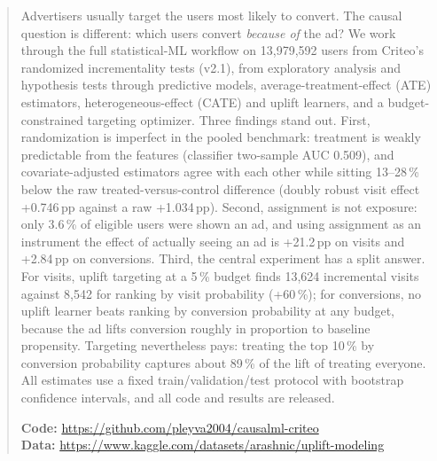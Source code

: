 \begin{abstract}
Advertisers usually target the users most likely to convert. The causal
question is different: which users convert \emph{because of} the ad? We work
through the full statistical-ML workflow on 13,979,592 users from Criteo's
randomized incrementality tests (v2.1), from exploratory analysis and
hypothesis tests through predictive models, average-treatment-effect (ATE)
estimators, heterogeneous-effect (CATE) and uplift learners, and a
budget-constrained targeting optimizer. Three findings stand out. First,
randomization is imperfect in the pooled benchmark: treatment is weakly
predictable from the features (classifier two-sample AUC 0.509), and
covariate-adjusted estimators agree with each other while sitting 13--28\,\%
below the raw treated-versus-control difference (doubly robust visit effect
+0.746\,pp against a raw +1.034\,pp). Second, assignment is not exposure: only
3.6\,\% of eligible users were shown an ad, and using assignment as an
instrument the effect of actually seeing an ad is +21.2\,pp on visits and
+2.84\,pp on conversions. Third, the central experiment has a split answer.
For visits, uplift targeting at a 5\,\% budget finds 13,624 incremental
visits against 8,542 for ranking by visit probability (+60\,\%); for
conversions, no uplift learner beats ranking by conversion probability at any
budget, because the ad lifts conversion roughly in proportion to baseline
propensity. Targeting nevertheless pays: treating the top 10\,\% by
conversion probability captures about 89\,\% of the lift of treating
everyone. All estimates use a fixed train/validation/test protocol with
bootstrap confidence intervals, and all code and results are released.

\medskip\noindent\small\textbf{Code:} \url{https://github.com/pleyva2004/causalml-criteo}\\
\textbf{Data:} \url{https://www.kaggle.com/datasets/arashnic/uplift-modeling}
\end{abstract}
